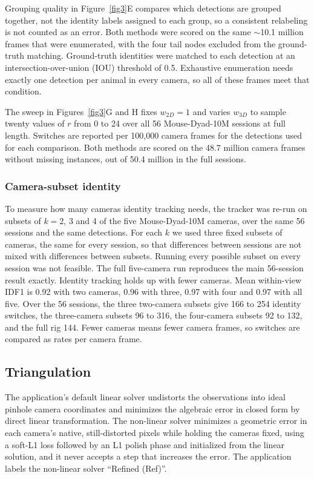 \documentclass[pdflatex, sn-nature]{sn-jnl}
\theoremstyle{thmstyleone}%
\theoremstyle{thmstyletwo}%
\theoremstyle{thmstylethree}%
\begin{document}
Grouping quality in Figure~\ref{fig3}E compares which detections are grouped together, not the identity labels assigned to each group, so a consistent relabeling is not counted as an error. Both methods were scored on the same $\sim$10.1 million frames that were enumerated, with the four tail nodes excluded from the ground-truth matching. Ground-truth identities were matched to each detection at an intersection-over-union (IOU) threshold of 0.5. Exhaustive enumeration needs exactly one detection per animal in every camera, so all of these frames meet that condition.
 
The sweep in Figures~\ref{fig3}G and H fixes $w_{2D} = 1$ and varies $w_{3D}$ to sample twenty values of $r$ from 0 to 24 over all 56 Mouse-Dyad-10M sessions at full length. Switches are reported per 100,000 camera frames for the detections used for each comparison. Both methods are scored on the 48.7 million camera frames without missing instances, out of 50.4 million in the full sessions.

\subsubsection{Camera-subset identity}\label{methods-subset}

To measure how many cameras identity tracking needs, the tracker was re-run on subsets of $k = 2$, 3 and 4 of the five Mouse-Dyad-10M cameras, over the same 56 sessions and the same detections. For each $k$ we used three fixed subsets of cameras, the same for every session, so that differences between sessions are not mixed with differences between subsets. Running every possible subset on every session was not feasible. The full five-camera run reproduces the main 56-session result exactly. Identity tracking holds up with fewer cameras. Mean within-view IDF1 is 0.92 with two cameras, 0.96 with three, 0.97 with four and 0.97 with all five. Over the 56 sessions, the three two-camera subsets give 166 to 254 identity switches, the three-camera subsets 96 to 316, the four-camera subsets 92 to 132, and the full rig 144. Fewer cameras means fewer camera frames, so switches are compared as rates per camera frame.

\subsection{Triangulation}\label{methods-triangulation}

The application's default linear solver undistorts the observations into ideal pinhole camera coordinates and minimizes the algebraic error in closed form by direct linear transformation. The non-linear solver minimizes a geometric error in each camera's native, still-distorted pixels while holding the cameras fixed, using a soft-L1 loss followed by an L1 polish phase and initialized from the linear solution, and it never accepts a step that increases the error. The application labels the non-linear solver ``Refined (Ref)''.
\end{document}
